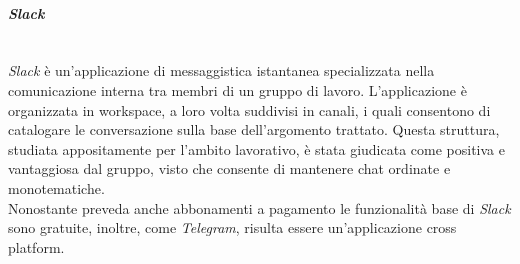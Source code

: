 \paragraph{\textit{Slack}} ~\\
	\textit{Slack} è un'applicazione di messaggistica istantanea specializzata nella comunicazione interna tra membri di un gruppo di lavoro. L'applicazione è organizzata in workspace, a loro volta suddivisi in canali, i quali 			consentono di catalogare le conversazione sulla base dell'argomento trattato. Questa struttura, studiata 						appositamente per l'ambito lavorativo, è stata giudicata come positiva e vantaggiosa dal gruppo, visto che 					consente di mantenere chat ordinate e monotematiche.\\
	Nonostante preveda anche abbonamenti a pagamento le funzionalità base di \textit{Slack} sono gratuite, inoltre, come \textit{Telegram}, risulta essere un'applicazione cross platform\glossario.
